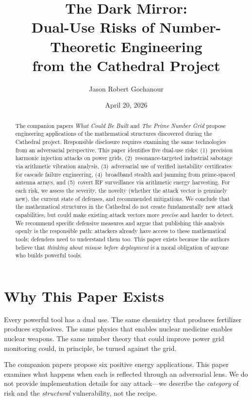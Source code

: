 \documentclass[11pt,a4paper]{article}
\title{%
  The Dark Mirror:\\
  Dual-Use Risks of Number-Theoretic Engineering\\
  from the Cathedral Project%
}
\author{
  Jason Robert Gochanour
}
\date{April 20, 2026}
\begin{document}
\maketitle

\begin{abstract}
The companion papers \emph{What Could Be Built} and \emph{The
Prime Number Grid} propose engineering applications of the
mathematical structures discovered during the Cathedral project.
Responsible disclosure requires examining the same technologies
from an adversarial perspective. This paper identifies five
dual-use risks: (1)~precision harmonic injection attacks on power
grids, (2)~resonance-targeted industrial sabotage via arithmetic
vibration analysis, (3)~adversarial use of verified instability
certificates for cascade failure engineering, (4)~broadband stealth
and jamming from prime-spaced antenna arrays, and (5)~covert RF
surveillance via arithmetic energy harvesting. For each risk, we
assess the severity, the novelty (whether the attack vector is
genuinely new), the current state of defenses, and recommended
mitigations. We conclude that the mathematical structures in the
Cathedral do not create fundamentally new attack capabilities, but
could make existing attack vectors more \emph{precise} and harder
to detect. We recommend specific defensive measures and argue that
publishing this analysis openly is the responsible path: attackers
already have access to these mathematical tools; defenders need to
understand them too. This paper exists because the authors believe
that \emph{thinking about misuse before deployment} is a moral
obligation of anyone who builds powerful tools.
\end{abstract}

\tableofcontents

\section{Why This Paper Exists}

Every powerful tool has a dual use. The same chemistry that produces
fertilizer produces explosives. The same physics that enables
nuclear medicine enables nuclear weapons. The same number theory
that could improve power grid monitoring could, in principle, be
turned against the grid.

The companion papers propose six positive energy applications. This
paper examines what happens when each is reflected through an
adversarial lens. We do not provide implementation details for any
attack---we describe the \emph{category} of risk and the
\emph{structural} vulnerability, not the recipe.
\end{document}
